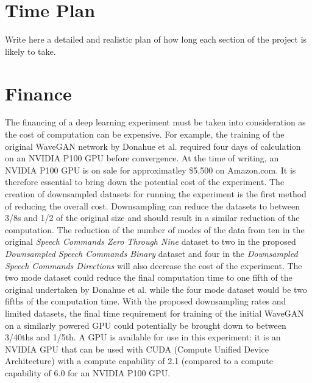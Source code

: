\documentclass[a4paper, titlepage]{article}
\begin{document}
\section{Time Plan}

Write here a detailed and realistic plan of how long each section of the project is likely to take.

\section{Finance}

The financing of a deep learning experiment must be taken into consideration as the cost of computation can be expensive.
For example, the training of the original WaveGAN network by Donahue et al. required four days of calculation on an NVIDIA P100 GPU before convergence.
At the time of writing, an NVIDIA P100 GPU is on sale for approximatley \$5,500 on Amazon.com.
It is therefore essential to bring down the potential cost of the experiment.
\newline
\newline
The creation of downsampled datasets for running the experiment is the first method of reducing the overall cost.
Downsampling can reduce the datasets to between 3/8s and 1/2 of the original size and should result in a similar reduction of the computation.
\newline
\newline
The reduction of the number of modes of the data from ten in the original \textit{Speech Commands Zero Through Nine} dataset to two in the proposed \textit{Downsampled Speech Commands Binary} dataset and four in the \textit{Downsampled Speech Commands Directions} will also decrease the cost of the experiment.
The two mode dataset could reduce the final computation time to one fifth of the original undertaken by Donahue et al. while the four mode dataset would be two fifths of the computation time.
\newline
\newline
With the proposed downsampling rates and limited datasets, the final time requirement for training of the initial WaveGAN on a similarly powered GPU could potentially be brought down to between 3/40ths and 1/5th.
\newline
\newline
A GPU is available for use in this experiment: it is an NVIDIA GPU that can be used with CUDA (Compute Unified Device Architecture) with a compute capability of 2.1 (compared to a compute capability of 6.0 for an NVIDIA P100 GPU.
\end{document}
